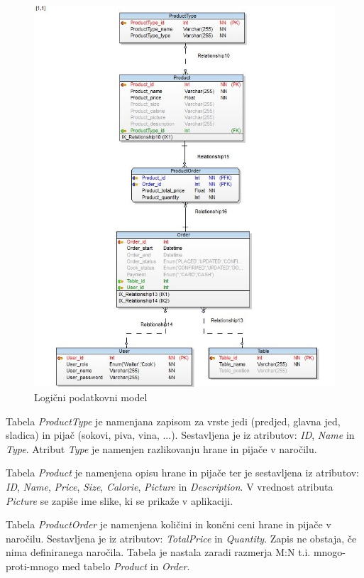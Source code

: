 \documentclass[a4paper, 12pt]{book}
\begin{document}
\begin{figure}[!htb]
\begin{center}
\includegraphics[width=11.9cm]{Database_physical}
\caption{Logični podatkovni model}
\label{Database_physical}
\end{center}
\end{figure}

Tabela \textit{ProductType} je namenjana zapisom za vrste jedi (predjed, glavna jed, sladica) in pijač (sokovi, piva, vina, ...). Sestavljena je iz atributov: \textit{ID}, \textit{Name} in \textit{Type}. Atribut \textit{Type} je namenjen razlikovanju hrane in pijače v naročilu.

Tabela \textit{Product} je namenjena opisu hrane in pijače ter je sestavljena iz atributov: \textit{ID}, \textit{Name}, \textit{Price}, \textit{Size}, \textit{Calorie}, \textit{Picture} in \textit{Description}. V vrednost atributa \textit{Picture} se zapiše ime slike, ki se prikaže v aplikaciji.

Tabela \textit{ProductOrder} je namenjena količini in končni ceni hrane in pijače v naročilu. Sestavljena je iz atributov: \textit{TotalPrice} in \textit{Quantity}. Zapis ne obstaja, če nima definiranega naročila. Tabela je nastala zaradi razmerja M:N t.i. mnogo-proti-mnogo med tabelo \textit{Product} in \textit{Order}.
\end{document}
